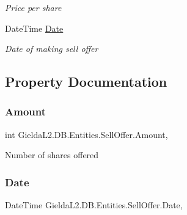 \begin{DoxyCompactItemize}
\begin{DoxyCompactList}\small\item\em Price per share \end{DoxyCompactList}\item 
Date\+Time \mbox{\hyperlink{class_gielda_l2_1_1_d_b_1_1_entities_1_1_sell_offer_ac869464f80621e93d905986a964ad100}{Date}}
\begin{DoxyCompactList}\small\item\em Date of making sell offer \end{DoxyCompactList}\end{DoxyCompactItemize}


\subsection{Property Documentation}
\mbox{\label{class_gielda_l2_1_1_d_b_1_1_entities_1_1_sell_offer_a859b9daefceda69ff1520c4192a39335}} 
\subsubsection{\texorpdfstring{Amount}{Amount}}
{\footnotesize\ttfamily int Gielda\+L2.\+D\+B.\+Entities.\+Sell\+Offer.\+Amount\hspace{0.3cm}{\ttfamily [get]}, {\ttfamily [set]}}



Number of shares offered 

\mbox{\label{class_gielda_l2_1_1_d_b_1_1_entities_1_1_sell_offer_ac869464f80621e93d905986a964ad100}} 
\subsubsection{\texorpdfstring{Date}{Date}}
{\footnotesize\ttfamily Date\+Time Gielda\+L2.\+D\+B.\+Entities.\+Sell\+Offer.\+Date\hspace{0.3cm}{\ttfamily [get]}, {\ttfamily [set]}}




